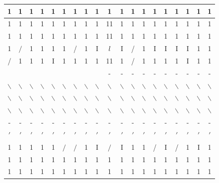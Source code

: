 \documentclass[10pt]{article}
\begin{document}
\begin{center}
\begin{tabular}{|c|c|c|c|c|c|c|c|c|c|c|c|c|c|c|c|c|c|c|}
\hline
1 & 1 & 1 & 1 & 1 & 1 & 1 & 1 & 1 & 1 & 1 & 1 & 1 & 1 & 1 & 1 & 1 & 1 & 1 \\
\hline
1 & 1 & 1 & 1 & 1 & 1 & 1 & 1 & 1 & 11 & 1 & 1 & 1 & 1 & 1 & 1 & 1 & 1 & 1 \\
\hline
1 & 1 & 1 & 1 & 1 & 1 & 1 & 1 & 1 & 11 & 1 & 1 & 1 & 1 & 1 & 1 & 1 & 1 & 1 \\
\hline
1 & $/$ & 1 & 1 & 1 & 1 & / & 1 & I & $l$ & I & / & 1 & I & I & I & I & 1 & 1 \\
\hline
/ & 1 & 1 & 1 & I & 1 & 1 & 1 & 1 & 11 & 1 & / & 1 & 1 & 1 & 1 & I & 1 & 1 \\
\hline
 &  &  &  &  &  &  &  &  & - & - & - & - & - & - & - & - & - & - \\
\hline
$\backslash$ & $\backslash$ & $\backslash$ & $\backslash$ & $\backslash$ & $\backslash$ & $\backslash$ & $\backslash$ & $\backslash$ & $\backslash$ & $\backslash$ & $\backslash$ & $\backslash$ & $\backslash$ & $\backslash$ & $\backslash$ & $\backslash$ & $\backslash$ & $\backslash$ \\
\hline
$\backslash$ & $\backslash$ & $\backslash$ & $\backslash$ & $\backslash$ & $\backslash$ & $\backslash$ & $\backslash$ & $\backslash$ & $\backslash$ & $\backslash$ & $\backslash$ & $\backslash$ & $\backslash$ & $\backslash$ & $\backslash$ & $\backslash$ & $\backslash$ & $\backslash$ \\
\hline
$\backslash$ & $\backslash$ & $\backslash$ & $\backslash$ & $\backslash$ & $\backslash$ & $\backslash$ & $\backslash$ & $\backslash$ & $\backslash$ & $\backslash$ & $\backslash$ & $\backslash$ & $\backslash$ & $\backslash$ & $\backslash$ & $\backslash$ & $\backslash$ & $\backslash$ \\
\hline
- & - & - & - & - & - & - & - & - & - & - & - & - & - & - & - & - & - & - \\
\hline
$\prime$ & $\prime$ & $\prime$ & $\prime$ & $\prime$ & $\prime$ & $\prime$ & $\prime$ & $\prime$ & $\prime$ & $\prime$ & $\prime$ & $\prime$ & $\prime$ & $\prime$ & $\prime$ & $\prime$ & $\prime$ & $\prime$ \\
\hline
1 & 1 & 1 & 1 & 1 & $/$ & $/$ & 1 & I & $/$ & I & 1 & 1 & / & I & / & 1 & I & 1 \\
\hline
1 & 1 & 1 & 1 & 1 & 1 & 1 & 1 & 1 & 1 & 1 & 1 & 1 & 1 & 1 & 1 & 1 & 1 & 1 \\
\hline
1 & 1 & 1 & 1 & 1 & 1 & 1 & 1 & 1 & 1 & 1 & 1 & 1 & 1 & 1 & 1 & 1 & 1 & 1 \\

\end{tabular}
\end{center}
\end{document}

